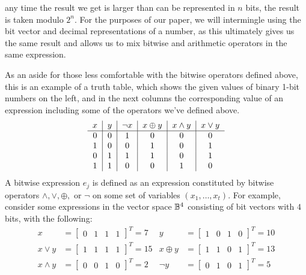 any time the result we get is larger than can be represented in $n$ bits, the result
is taken modulo $2^n$. For the purposes of our paper, we will intermingle using the 
bit vector and decimal representations of a number, as this ultimately gives us the 
same result and allows us to mix bitwise and arithmetic operators in the same
expression.
\par As an aside for those less comfortable with the bitwise operators defined above, 
this is an example of a truth table, which shows the given values of binary 1-bit
numbers on the left, and in the next columns the corresponding value of an 
expression including some of the operators we've defined above.
\begin{align*}
    \begin{tabular}{c|c|c|c|c|c}
        $x$ & $y$ & $\neg x$ & $x \oplus y$ & $x \land y$ & $x \lor y$\\
        \hline
        0 & 0 & 1 & 0 & 0 & 0\\
        1 & 0 & 0 & 1 & 0 & 1\\
        0 & 1 & 1 & 1 & 0 & 1\\
        1 & 1 & 0 & 0 & 1 & 0\\
    \end{tabular}
\end{align*}
 {
    A bitwise expression $e_j$ is defined as an expression constituted by
    bitwise operators $\land, \lor, \oplus,$ or $\neg$ on some set of variables
    $(x_1, \dots, x_t)$. For example, consider some expressions in the vector space $\mathbb{B}^4$ consisting
    of bit vectors with $4$ bits, with the following:
    \begin{align*}
        x &= \begin{bmatrix}
        0 & 1 & 1 & 1
    \end{bmatrix}^T = 7 & y &= \begin{bmatrix}
        1 & 0 & 1 & 0
    \end{bmatrix}^T = 10
    \\
    x \lor y &= \begin{bmatrix}
        1 & 1 & 1 & 1
    \end{bmatrix}^T = 15
             & x \oplus y &= \begin{bmatrix}
                  1 & 1 & 0 & 1
              \end{bmatrix}^T = 13
    \\
        x \land y &= 
        \begin{bmatrix}
            0 & 0 & 1 & 0
        \end{bmatrix}^T = 2 & \neg y &= \begin{bmatrix}
        0 & 1 & 0 & 1
        \end{bmatrix}^T
        = 5
    \end{align*}
}
